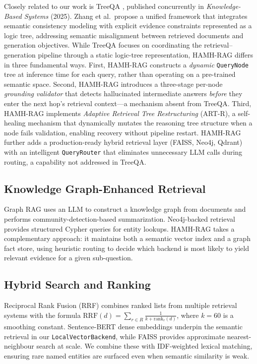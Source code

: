 \documentclass[conference]{IEEEtran}
\begin{document}
Closely related to our work is TreeQA \cite{zhang2025treeqa}, published
concurrently in \textit{Knowledge-Based Systems} (2025).  Zhang et al.\ propose
a unified framework that integrates semantic consistency modeling with
explicit evidence constraints represented as a logic tree, addressing
semantic misalignment between retrieved documents and generation objectives.
While TreeQA focuses on coordinating the retrieval--generation pipeline
through a static logic-tree representation, HAMH-RAG differs in three
fundamental ways.  First, HAMH-RAG constructs a \emph{dynamic}
\texttt{QueryNode} tree at inference time for each query, rather than
operating on a pre-trained semantic space.  Second, HAMH-RAG introduces a
three-stage per-node \emph{grounding validator} that detects hallucinated
intermediate answers \emph{before} they enter the next hop's retrieval
context---a mechanism absent from TreeQA.  Third, HAMH-RAG implements
\emph{Adaptive Retrieval Tree Restructuring} (ART-R), a self-healing
mechanism that dynamically mutates the reasoning tree structure when a
node fails validation, enabling recovery without pipeline restart.
HAMH-RAG further adds a production-ready hybrid retrieval layer (FAISS,
Neo4j, Qdrant) with an intelligent \texttt{QueryRouter} that eliminates
unnecessary LLM calls during routing, a capability not addressed in
TreeQA.

\subsection{Knowledge Graph-Enhanced Retrieval}

Graph RAG \cite{edge2024local} uses an LLM to construct a knowledge graph
from documents and performs community-detection-based summarization.
Neo4j-backed retrieval \cite{neo4j2020graph} provides structured Cypher
queries for entity lookups.  HAMH-RAG takes a complementary approach: it
maintains both a semantic vector index and a graph fact store, using
heuristic routing to decide which backend is most likely to yield relevant
evidence for a given sub-question.

\subsection{Hybrid Search and Ranking}

Reciprocal Rank Fusion (RRF) \cite{cormack2009reciprocal} combines ranked
lists from multiple retrieval systems with the formula
$\text{RRF}(d) = \sum_{r \in R} \frac{1}{k + \text{rank}_r(d)}$, where
$k=60$ is a smoothing constant.  Sentence-BERT \cite{reimers2019sentence}
dense embeddings underpin the semantic retrieval in our
\texttt{LocalVectorBackend}, while FAISS \cite{johnson2019billion}
provides approximate nearest-neighbour search at scale.  We combine
these with IDF-weighted lexical matching, ensuring rare named entities
are surfaced even when semantic similarity is weak.
\end{document}
